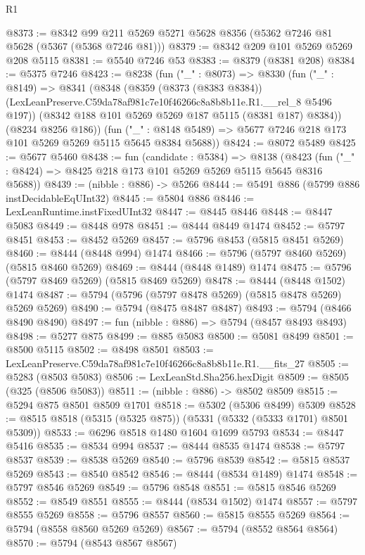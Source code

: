 \begin{lexlean}{R1}
\begin{coremodule}
@8373 := @8342 @99 @211 @5269 @5271 @5628 @8356 (@5362 @7246 @81 @5628 (@5367 (@5368 @7246 @81)))
@8379 := @8342 @209 @101 @5269 @5269 @208 @5115
@8381 := @5540 @7246 @53
@8383 := @8379 (@8381 @208)
@8384 := @5375 @7246
@8423 := @8238
    (fun ("_" : @8073) =>
    @8330
      (fun ("_" : @8149) =>
      @8341
        (@8348
          (@8359
            (@8373 (@8383 @8384))
            (LexLeanPreserve.C59da78af981c7e10f46266c8a8b8b11e.R1.__rel_8 @5496 @197))
          (@8342 @188 @101 @5269 @5269 @187 @5115 (@8381 @187) @8384))
        (@8234 @8256 @186))
      (fun ("_" : @8148 @5489) => @5677 @7246 @218 @173 @101 @5269 @5269 @5115 @5645 @8384 @5688))
@8424 := @8072 @5489
@8425 := @5677 @5460
@8438 := fun (candidate : @5384) =>
  @8138 (@8423 (fun ("_" : @8424) => @8425 @218 @173 @101 @5269 @5269 @5115 @5645 @8316 @5688))
@8439 := (nibble : @886) -> @5266
@8444 := @5491 @886 (@5799 @886 instDecidableEqUInt32)
@8445 := @5804 @886
@8446 := LexLeanRuntime.instFixedUInt32
@8447 := @8445 @8446
@8448 := @8447 @5083
@8449 := @8448 @978
@8451 := @8444 @8449 @1474
@8452 := @5797 @8451
@8453 := @8452 @5269
@8457 := @5796 @8453 (@5815 @8451 @5269)
@8460 := @8444 (@8448 @994) @1474
@8466 := @5796 (@5797 @8460 @5269) (@5815 @8460 @5269)
@8469 := @8444 (@8448 @1489) @1474
@8475 := @5796 (@5797 @8469 @5269) (@5815 @8469 @5269)
@8478 := @8444 (@8448 @1502) @1474
@8487 := @5794 (@5796 (@5797 @8478 @5269) (@5815 @8478 @5269) @5269 @5269)
@8490 := @5794 (@8475 @8487 @8487)
@8493 := @5794 (@8466 @8490 @8490)
@8497 := fun (nibble : @886) => @5794 (@8457 @8493 @8493)
@8498 := @5277 @875
@8499 := @885 @5083
@8500 := @5081 @8499
@8501 := @8500 @5115
@8502 := @8498 @8501
@8503 := LexLeanPreserve.C59da78af981c7e10f46266c8a8b8b11e.R1.__fits_27
@8505 := @5283 (@8503 @5083)
@8506 := LexLeanStd.Sha256.hexDigit
@8509 := @8505 (@325 (@8506 @5083))
@8511 := (nibble : @886) -> @8502 @8509
@8515 := @5294 @875 @8501 @8509 @1701
@8518 := @5302 (@5306 @8499) @5309
@8528 := @8515 @8518 (@5315 (@5325 @875)) (@5331 (@5332 (@5333 @1701) @8501 @5309))
@8533 := @6296 @8518 @1480 @1604 @1699 @5793
@8534 := @8447 @5416
@8535 := @8534 @994
@8537 := @8444 @8535 @1474
@8538 := @5797 @8537
@8539 := @8538 @5269
@8540 := @5796 @8539
@8542 := @5815 @8537 @5269
@8543 := @8540 @8542
@8546 := @8444 (@8534 @1489) @1474
@8548 := @5797 @8546 @5269
@8549 := @5796 @8548
@8551 := @5815 @8546 @5269
@8552 := @8549 @8551
@8555 := @8444 (@8534 @1502) @1474
@8557 := @5797 @8555 @5269
@8558 := @5796 @8557
@8560 := @5815 @8555 @5269
@8564 := @5794 (@8558 @8560 @5269 @5269)
@8567 := @5794 (@8552 @8564 @8564)
@8570 := @5794 (@8543 @8567 @8567)

\end{coremodule}
\end{lexlean}

